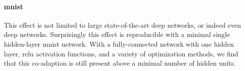 \documentclass[thesis]{subfiles}
\begin{document}
\paragraph{\Gls{mnist}} This effect is not limited to large state-of-the-art deep networks, or indeed even deep networks. Surprisingly this effect is reproducible with a minimal single hidden-layer \gls{mnist} network. With a fully-connected network with one hidden layer, \gls{relu} activation functions, and a variety of optimization methods, we find that this co-adaption is still present above a minimal number of hidden units.  
\begin{figure}[tbp]
\begin{subfigure}[b]{\linewidth}
\centering
{}
\end{subfigure}
\end{figure}
\end{document}
